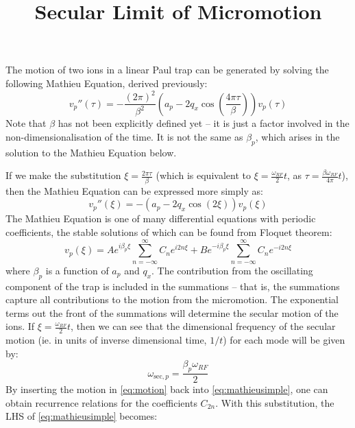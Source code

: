 \documentclass{article}
\title{Secular Limit of Micromotion}
\begin{document}
\maketitle
\noindent The motion of two ions in a linear Paul trap can be generated by solving the following Mathieu Equation, derived previously:
\begin{equation}
v_p''(\tau) = - \frac{(2 \pi)^2}{\beta^2} \left( a_p - 2 q_x \cos \left( \frac{4 \pi \tau}{\beta} \right) \right) v_p (\tau)	
\label{eq:mathieu}
\end{equation}
Note that $\beta$ has not been explicitly defined yet -- it is just a factor involved in the non-dimensionalisation of the time. It is not the same as $\beta_p$, which arises in the solution to the Mathieu Equation below. \par
\medskip
\noindent If we make the substitution $\xi = \frac{2 \pi \tau}{\beta}$ (which is equivalent to $\xi = \frac{\omega_{RF}}{2} t$, as $\tau = \frac{\beta \omega_{RF}}{4 \pi} t$), then the Mathieu Equation can be expressed more simply as:
\begin{equation}
v_p''(\xi)	= - \left( a_p - 2 q_x \cos \left( 2 \xi \right) \right) v_p (\xi)
\label{eq:mathieusimple}
\end{equation}
The Mathieu Equation is one of many differential equations with periodic coefficients, the stable solutions of which can be found from Floquet theorem:
\begin{equation}
	v_p (\xi) = A e^{i \beta_p \xi} \sum_{n = - \infty}^{\infty} C_{n} e^{i 2 n \xi} + B e^{- i \beta_p \xi} \sum_{n = - \infty}^{\infty} C_{n} e^{- i 2 n \xi}
	\label{eq:motion}
\end{equation}
where $\beta_p$ is a function of $a_p$ and $q_x$. The contribution from the oscillating component of the trap is included in the summations -- that is, the summations capture all contributions to the motion from the micromotion. The exponential terms out the front of the summations will determine the secular motion of the ions. 
If $\xi = \frac{\omega_{RF}}{2} t$, then we can see that the dimensional frequency of the secular motion (ie. in units of inverse dimensional time, $1/t$) for each mode will be given by:
\begin{equation}
\omega_{\text{sec}, p} = \frac{\beta_p \omega_{RF}}{2} \label{eq:sec}
\end{equation}
By inserting the motion in \eqref{eq:motion} back into \eqref{eq:mathieusimple}, one can obtain recurrence relations for the coefficients $C_{2n}$. With this substitution, the LHS of \eqref{eq:mathieusimple} becomes:
\end{document}
